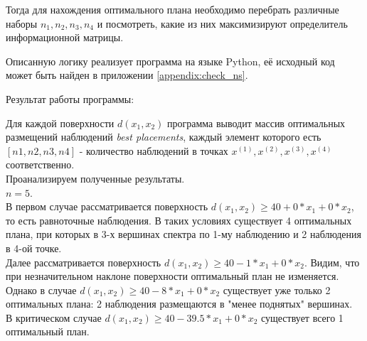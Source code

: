 Тогда для нахождения оптимального плана необходимо перебрать различные наборы $n_1, n_2, n_3, n_4$ и посмотреть, какие из них максимизируют определитель информационной матрицы.  

Описанную логику реализует программа на языке Python, её исходный код может быть найден в приложении \ref{appendix:check_ns}.

Результат работы программы:



Для каждой поверхности $d(x_1, x_2)$ программа выводит массив оптимальных размещений наблюдений \textit{best placements}, каждый элемент которого есть $[n1, n2, n3, n4]$ -  количество наблюдений в точках $x^{(1)}, x^{(2)}, x^{(3)}, x^{(4)}$ соответственно.\\
Проанализируем полученные результаты.\\
$n = 5$.\\
В первом случае рассматривается поверхность $d(x_1, x_2) \ge 40 + 0*x_1 + 0*x_2$, то есть равноточные наблюдения. В таких условиях существует 4 оптимальных плана, при которых в 3-х вершинах спектра по 1-му наблюдению и 2 наблюдения в 4-ой точке. \\
Далее рассматривается поверхность $d(x_1, x_2) \ge 40 - 1*x_1 + 0*x_2$. Видим, что при незначительном наклоне поверхности оптимальный план не изменяется. \\
Однако в случае $d(x_1, x_2) \ge 40 - 8*x_1 + 0*x_2$ существует уже только 2 оптимальных плана: 2 наблюдения размещаются в "менее поднятых" вершинах.\\
В критическом случае $d(x_1, x_2) \ge 40 - 39.5*x_1 + 0*x_2$ существует всего 1 оптимальный план.